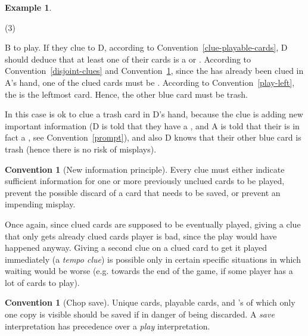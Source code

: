 \documentclass[a4paper]{article}
\theoremstyle{plain}
\theoremstyle{definition}
\newtheorem{example}[theorem]{Example}
\newtheorem{convention}[theorem]{Convention}
\begin{document}
\begin{example}
	\hfill
	\begin{tasks}(3)
		\task[+]      
		\task[A]    
		\task[B]    
		\task[C]    
		\task[D]    
		\task[E]    
	\end{tasks}

	B to play. If they clue  to D, according to Convention~\ref{clue-playable-cards}, D should deduce that at least one of their cards is a  or . According to Convention~\ref{disjoint-clues} and Convention~\ref{new-information}, since the  has already been clued in A's hand, one of the clued cards must be . According to Convention~\ref{play-left}, the  is the leftmost card. Hence, the other blue card must be trash.
	
	In this case is ok to clue a trash card in D's hand, because the clue is adding new important information (D is told that they have a , and A is told that their  is in fact a , see Convention~\ref{prompt}), and also D knows that their other blue card is trash (hence there is no risk of misplays).
\end{example}

\begin{convention}[New information principle]
	\label{new-information}
	Every clue must either indicate sufficient information for one or more previously unclued cards to be played, prevent the possible discard of a card that needs to be saved, or prevent an impending misplay.
\end{convention}

Once again, since clued cards are supposed to be eventually played, giving a clue that only gets already clued cards player is bad, since the play would have happened anyway. Giving a second clue on a clued card to get it played immediately (a \textit{tempo clue}) is possible only in certain specific situations in which waiting would be worse (e.g. towards the end of the game, if some player has a lot of cards to play).

\begin{convention}[Chop save]
	Unique cards, playable cards, and 's of which only one copy is visible should be saved if in danger of being discarded. A \textit{save} interpretation has precedence over a \textit{play} interpretation.
\end{convention}
\end{document}
